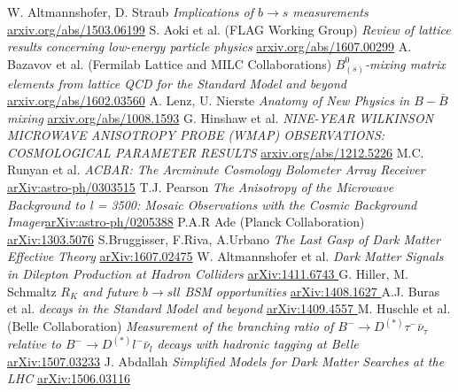 \documentclass[11pt,a4paper,twoside]{article}
\numberwithin{equation}{section}
\begin{document}
\begin{thebibliography}{xxx}
 W. Altmannshofer, D. Straub \textit{Implications of $b\rightarrow s$ measurements} \href{https://arxiv.org/abs/1503.06199}{arxiv.org/abs/1503.06199}
 S. Aoki et al. (FLAG Working Group) \textit{Review of lattice results concerning low-energy particle physics} \href{https://arxiv.org/abs/1607.00299}{arxiv.org/abs/1607.00299}
 A. Bazavov et al. (Fermilab Lattice and MILC Collaborations) \textit{$B^0_{(s)}$-mixing matrix elements from lattice QCD for the Standard Model and beyond} \href{https://arxiv.org/abs/1602.03560}{arxiv.org/abs/1602.03560}
 A. Lenz, U. Nierste \textit{Anatomy of New Physics in $B-\bar B$ mixing} \href{https://arxiv.org/abs/1008.1593}{arxiv.org/abs/1008.1593}
 G. Hinshaw et al. \textit{NINE-YEAR WILKINSON MICROWAVE ANISOTROPY PROBE (WMAP) OBSERVATIONS: COSMOLOGICAL PARAMETER RESULTS}  \href{https://arxiv.org/abs/1212.5226}{arxiv.org/abs/1212.5226}
 M.C. Runyan et al. \textit{ACBAR: The Arcminute Cosmology Bolometer Array Receiver} \href{https://arxiv.org/abs/astro-ph/0303515}{arXiv:astro-ph/0303515}
 T.J. Pearson \textit{The Anisotropy of the Microwave Background to l = 3500: Mosaic Observations with the Cosmic Background Imager}\href{https://arxiv.org/abs/astro-ph/0205388}{arXiv:astro-ph/0205388}
 P.A.R Ade (Planck Collaboration) \href{https://arxiv.org/abs/1303.5076}{arXiv:1303.5076}
 S.Bruggisser, F.Riva, A.Urbano \textit{The Last Gasp of Dark Matter Effective Theory} \href{https://arxiv.org/abs/1607.02475}{arXiv:1607.02475}
 W. Altmannshofer et al. \textit{Dark Matter Signals in Dilepton Production at Hadron Colliders} \href{https://arxiv.org/abs/1411.6743}{arXiv:1411.6743 }
 G. Hiller, M. Schmaltz \textit{$R_K$ and future $b\rightarrow sll$ BSM opportunities} \href{https://arxiv.org/abs/1408.1627}{arXiv:1408.1627 }
 A.J. Buras et al. \textit{decays in the Standard Model and beyond} \href{https://arxiv.org/abs/1409.4557}{arXiv:1409.4557 }
 M. Huschle et al. (Belle Collaboration) \textit{Measurement of the branching ratio of $B^-\rightarrow D^{(*)}\tau^-\bar \nu_\tau$ relative to $B^-\rightarrow D^{(*)}l^-\bar \nu_l$ decays with hadronic tagging at Belle} \href{https://arxiv.org/abs/1507.03233}{arXiv:1507.03233}
 J. Abdallah \textit{Simplified Models for Dark Matter Searches at the LHC} \href{https://arxiv.org/abs/1506.03116}{arXiv:1506.03116}

\end{thebibliography}
\end{document}
